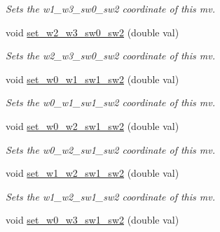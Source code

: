 \begin{DoxyCompactItemize}
\begin{DoxyCompactList}\small\item\em Sets the w1\-\_\-w3\-\_\-sw0\-\_\-sw2 coordinate of this mv. \end{DoxyCompactList}\item 
\hypertarget{classe3ga_1_1mv_a5382f1f56841aace97692ad7b0bff516}{void \hyperlink{classe3ga_1_1mv_a5382f1f56841aace97692ad7b0bff516}{set\-\_\-w2\-\_\-w3\-\_\-sw0\-\_\-sw2} (double val)}\label{classe3ga_1_1mv_a5382f1f56841aace97692ad7b0bff516}

\begin{DoxyCompactList}\small\item\em Sets the w2\-\_\-w3\-\_\-sw0\-\_\-sw2 coordinate of this mv. \end{DoxyCompactList}\item 
\hypertarget{classe3ga_1_1mv_af9d06c7a3b645f264d532fee75edf824}{void \hyperlink{classe3ga_1_1mv_af9d06c7a3b645f264d532fee75edf824}{set\-\_\-w0\-\_\-w1\-\_\-sw1\-\_\-sw2} (double val)}\label{classe3ga_1_1mv_af9d06c7a3b645f264d532fee75edf824}

\begin{DoxyCompactList}\small\item\em Sets the w0\-\_\-w1\-\_\-sw1\-\_\-sw2 coordinate of this mv. \end{DoxyCompactList}\item 
\hypertarget{classe3ga_1_1mv_a8563098163721baa98ec98f077ff73f7}{void \hyperlink{classe3ga_1_1mv_a8563098163721baa98ec98f077ff73f7}{set\-\_\-w0\-\_\-w2\-\_\-sw1\-\_\-sw2} (double val)}\label{classe3ga_1_1mv_a8563098163721baa98ec98f077ff73f7}

\begin{DoxyCompactList}\small\item\em Sets the w0\-\_\-w2\-\_\-sw1\-\_\-sw2 coordinate of this mv. \end{DoxyCompactList}\item 
\hypertarget{classe3ga_1_1mv_a12210d9b664979d95de2a6747ca63458}{void \hyperlink{classe3ga_1_1mv_a12210d9b664979d95de2a6747ca63458}{set\-\_\-w1\-\_\-w2\-\_\-sw1\-\_\-sw2} (double val)}\label{classe3ga_1_1mv_a12210d9b664979d95de2a6747ca63458}

\begin{DoxyCompactList}\small\item\em Sets the w1\-\_\-w2\-\_\-sw1\-\_\-sw2 coordinate of this mv. \end{DoxyCompactList}\item 
\hypertarget{classe3ga_1_1mv_a2030af5c1e89441c83e7428be73c0236}{void \hyperlink{classe3ga_1_1mv_a2030af5c1e89441c83e7428be73c0236}{set\-\_\-w0\-\_\-w3\-\_\-sw1\-\_\-sw2} (double val)}\label{classe3ga_1_1mv_a2030af5c1e89441c83e7428be73c0236}


\end{DoxyCompactItemize}
